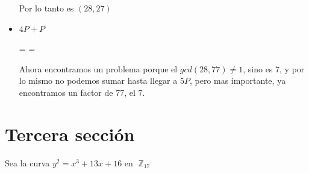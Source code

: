 \documentclass[12pt, fleqn]{report}                             %
\def \Eq {equation}                                             %
\newenvironment{MultiLineEquation*}[1]                          %
        {\begin{\Eq*}\begin{alignedat}{#1}}                         %
        {\end{alignedat}\end{\Eq*}}                                 %
\theoremstyle{break}                                            %
\DeclareMathOperator \Integers     {\mathbb{Z}}                 %
\begin{document}
\begin{itemize}
      Por lo tanto es $(28, 27)$
    
      \item $4P + P$
      \begin{MultiLineEquation*}{3}
          \lambda
            =   
            =      
      \end{MultiLineEquation*}

      Ahora encontramos un problema porque
      el $gcd(28, 77) \neq 1$, sino es 7, 
      y por lo mismo no podemos sumar hasta llegar
      a $5P$, pero mas importante, ya encontramos
      un factor de 77, el 7.

  \end{itemize}
      


\chapter{Tercera sección}

  Sea la curva $y^2 = x^3 + 13x + 16$ en $\Integers_{17}$
\end{document}
